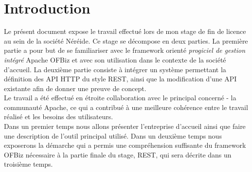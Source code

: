 \chapter{Introduction}

Le présent document expose le travail effectué lors de mon stage de fin de licence au sein de la société Néréide.
Ce stage se décompose en deux parties.
La première partie a pour but de se familiariser avec le framework
orienté \emph{progiciel de gestion intégré}
Apache OFBiz et avec son utilisation dans le contexte de la société d'accueil. 
La deuxième partie consiste à intégrer un système permettant la définition des API HTTP
du style REST,
 ainsi que la modification d'une API existante afin de donner une preuve de concept. \\
Le travail a été effectué en étroite collaboration avec le principal concerné - la 
communauté Apache,
ce qui a contribué à une meilleure cohérence entre le travail réalisé et les besoins des utilisateurs.\\
Dans un premier temps nous allons présenter l'entreprise d'accueil ainsi que faire une description de
l'outil principal utilisé.
Dans un deuxième temps nous exposerons la démarche qui a permis une compréhension suffisante du framework OFBiz
 nécessaire à la partie finale du stage, REST, qui sera décrite dans un troisième temps.

